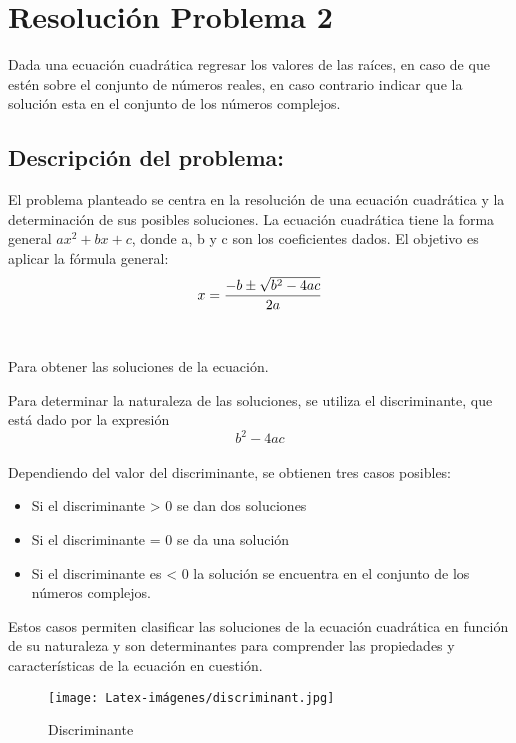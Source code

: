 \section{Resolución Problema 2} 
Dada una ecuación cuadrática regresar los valores de las raíces, en caso de que estén sobre el conjunto de números reales, en caso contrario indicar que la solución esta en el conjunto de los números complejos.


\subsection{\textbf{Descripción del problema:}}
El problema planteado se centra en la resolución de una ecuación cuadrática y la determinación de sus posibles soluciones. La ecuación cuadrática tiene la forma general $ax^{2}+bx+c$, donde a, b y c son los coeficientes dados. El objetivo es aplicar la fórmula general:
\begin{equation}
\\
\\ x = \frac{{-b \pm \sqrt{{b^2 - 4ac}}}}{{2a}} \\
\end{equation}
\\
\\Para obtener las soluciones de la ecuación.

Para determinar la naturaleza de las soluciones, se utiliza el discriminante, que está dado por la expresión 
\begin{equation}
 b^2 - 4ac 
\end{equation}
\\Dependiendo del valor del discriminante, se obtienen tres casos posibles:
\begin{itemize}
    \item Si el discriminante > 0 se dan dos soluciones
    \item Si el discriminante = 0 se da una solución
    \item Si el discriminante es < 0 la solución se encuentra en el conjunto de los números complejos. 
\end{itemize}
 Estos casos permiten clasificar las soluciones de la ecuación cuadrática en función de su naturaleza y son determinantes para comprender las propiedades y características de la ecuación en cuestión.


\begin{figure}[H]
    \centering
    \texttt{[image: Latex-imágenes/discriminant.jpg]}
    \caption{Discriminante}
    \label{fig:Discriminante}
\end{figure}


